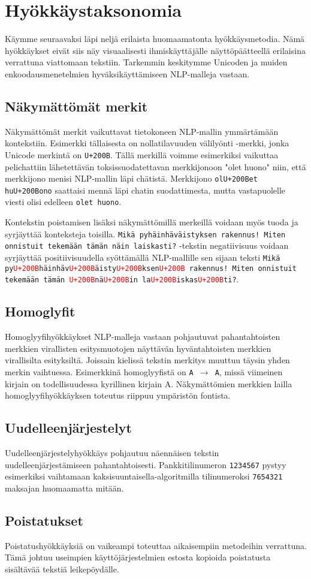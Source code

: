 \chapter{Hyökkäystaksonomia\label{results}}
Käymme seuraavaksi läpi neljä erilaista huomaamatonta hyökkäysmetodia. Nämä hyökkäykset eivät siis näy visuaalisesti ihmiskäyttäjälle näyttöpäätteellä erilaisina verrattuna viattomaan tekstiin. Tarkemmin keskitymme Unicoden ja muiden enkoodausmenetelmien hyväksikäyttämiseen NLP-malleja vastaan.

\section{Näkymättömät merkit}
Näkymättömät merkit vaikuttavat tietokoneen NLP-mallin ymmärtämään kontekstiin. Esimerkki tällaisesta on nollatilavuuden välilyönti -merkki, jonka Unicode merkintä on \texttt{U+200B}. Tällä merkillä voimme esimerkiksi vaikuttaa pelichattiin lähetettävän toksissuodatettavan merkkijonoon "olet huono" niin, että merkkijono menisi NLP-mallin läpi chätistä. Merkkijono \texttt{olU+200Bet huU+200Bono} saattaisi mennä läpi chatin suodattimesta, mutta vastapuolelle viesti olisi edelleen \texttt{olet huono}.

Kontekstin poistamisen lisäksi näkymättömillä merkeillä voidaan myös tuoda ja syrjäyttää konteksteja toisilla. \texttt{Mikä pyhäinhäväistyksen rakennus! Miten onnistuit te\-kemään tämän näin laiskasti?} -tekstin negatiivisuus voidaan syrjäyttää positiivisuudella syöttämällä NLP-mallille sen sijaan teksti \texttt{Mikä py\textcolor{red}{U+200B}häinhäv\textcolor{red}{U+200B}äisty\textcolor{red}{U+200B}ksen\textcolor{red}{U+200B} rakennus! Miten onnistuit tekemään tämän \textcolor{red}{U+200B}nä\textcolor{red}{U+200B}in la\textcolor{red}{U+200B}iskas\textcolor{red}{U+200B}ti?}.

\section{Homoglyfit}
Homoglyyfihyökkäykset NLP-malleja vastaan pohjautuvat pahantahtoisten merkkien virallisten esitysmuotojen näyttävän hyväntahtoisten merkkien virallisilta esityksiltä. Joissain kielissä tekstin merkitys muuttuu täysin yhden merkin vaihtuessa. Esimerkkinä homoglyyfistä on \texttt{A $\rightarrow$ A}, missä viimeinen kirjain on todellisuudessa kyrillinen kirjain A. Näkymättömien merkkien lailla homoglyyfihyökkäyksen toteutus riippuu ympäristön fontista.

\section{Uudelleenjärjestelyt}
Uudelleenjärjestelyhyökkäys pohjautuu näennäisen tekstin uudelleenjärjestämiseen pahantahtoisesti. Pankkitilinumeron \texttt{1234567} pystyy esimerkiksi vaihtamaan kaksisuuntaisella-algoritmilla tilinumeroksi \texttt{7654321} maksajan huomaamatta mitään.

\section{Poistatukset}
Poistatushyökkäyksiä on vaikeampi toteuttaa aikaisempiin metodeihin verrattuna. Tämä johtuu useimpien käyttöjärjestelmien estosta kopioida poistatusta sisältävää tekstiä leikepöydälle.